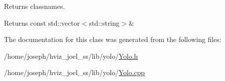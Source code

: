 Returns classnames. 

\begin{DoxyReturn}{Returns}
const std\+::vector$<$std\+::string$>$\& 
\end{DoxyReturn}


The documentation for this class was generated from the following files\+:\begin{DoxyCompactItemize}
\item 
/home/joseph/hviz\+\_\+joel\+\_\+ss/lib/yolo/\hyperlink{Yolo_8h}{Yolo.\+h}\item 
/home/joseph/hviz\+\_\+joel\+\_\+ss/lib/yolo/\hyperlink{Yolo_8cpp}{Yolo.\+cpp}\end{DoxyCompactItemize}

